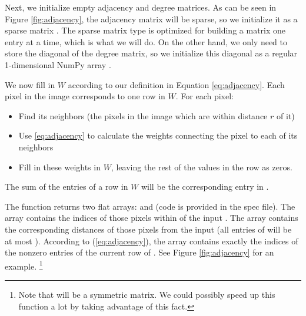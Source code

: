 Next, we initialize empty adjacency and degree matrices. As can be seen in Figure \ref{fig:adjacency}, the adjacency matrix will be sparse, so we initialize it as a sparse matrix . The sparse matrix type  is optimized for building a matrix one entry at a time, which is what we will do. On the other hand, we only need to store the diagonal of the degree matrix, so we initialize this diagonal as a regular 1-dimensional NumPy array .

We now fill in $W$ according to our definition in Equation \ref{eq:adjacency}.
Each pixel in the image corresponds to one row in $W$.
For each pixel:
\begin{itemize}
\item Find its neighbors (the pixels in the image which are within distance $r$ of it)
\item Use \ref{eq:adjacency} to calculate the weights connecting the pixel to each of its neighbors
\item Fill in these weights in $W$, leaving the rest of the values in the row as zeros.
\end{itemize}
The sum of the entries of a row in $W$ will be the corresponding entry in . 

The function  returns two flat arrays:  and  (code is provided in the spec file). The array  contains the indices of those pixels within  of the input . The array  contains the corresponding distances of those pixels from the input  (all entries of  will be at most ). According to (\ref{eq:adjacency}), the array  contains exactly the indices of the nonzero entries of the current row of .  See Figure \ref{fig:adjacency} for an example. \footnote{Note that  will be a symmetric matrix. We could possibly speed up this function a lot by taking advantage of this fact.}

